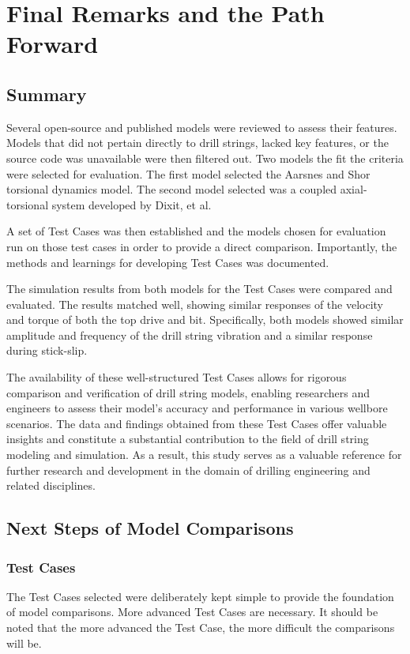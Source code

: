 \chapter{Final Remarks and the Path Forward}
\section{Summary}
Several open-source and published models were reviewed to assess their features.  Models that did not pertain directly to drill strings, lacked key features, or the source code was unavailable were then filtered out.  Two models the fit the criteria were selected for evaluation.  The first model selected the Aarsnes and Shor torsional dynamics model.  The second model selected was a coupled axial-torsional system developed by Dixit, et al.

A set of Test Cases was then established and the models chosen for evaluation run on those test cases in order to provide a direct comparison.  Importantly, the methods and learnings for developing Test Cases was documented.

The simulation results from both models for the Test Cases were compared and evaluated. The results matched well, showing similar responses of the velocity and torque of both the top drive and bit. Specifically, both models showed similar amplitude and frequency of the drill string vibration and a similar response during stick-slip.

The availability of these well-structured Test Cases allows for rigorous comparison and verification of drill string models, enabling researchers and engineers to assess their model's accuracy and performance in various wellbore scenarios. The data and findings obtained from these Test Cases offer valuable insights and constitute a substantial contribution to the field of drill string modeling and simulation. As a result, this study serves as a valuable reference for further research and development in the domain of drilling engineering and related disciplines.

\section{Next Steps of Model Comparisons}
\subsection{Test Cases}
The Test Cases selected were deliberately kept simple to provide the foundation of model comparisons.  More advanced Test Cases are necessary.  It should be noted that the more advanced the Test Case, the more difficult the comparisons will be.

